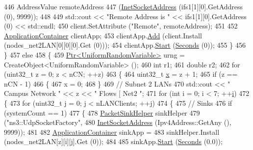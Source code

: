\begin{DoxyCode}
446           AddressValue remoteAddress
447             (\hyperlink{classns3_1_1InetSocketAddress}{InetSocketAddress} (ifs1[1][0].GetAddress (0), 9999));
448 
449           std::cout << \textcolor{stringliteral}{"Remote Address is "} << ifs1[1][0].GetAddress (0) << std::endl;
450           client.SetAttribute (\textcolor{stringliteral}{"Remote"}, remoteAddress);
451 
452           \hyperlink{classns3_1_1ApplicationContainer}{ApplicationContainer} clientApp;
453           clientApp.\hyperlink{classns3_1_1ApplicationContainer_ad09ab1a1ad5849d518d5f4c262e38152}{Add} (client.Install (nodes\_net2LAN[0][0][0].Get (0)));
454           clientApp.\hyperlink{classns3_1_1ApplicationContainer_a8eff87926507020bbe3e1390358a54a7}{Start} (\hyperlink{group__timecivil_ga33c34b816f8ff6628e33d5c8e9713b9e}{Seconds} (0));
455         \}
456     \}
457   \textcolor{keywordflow}{else}
458     \{
459       \hyperlink{classns3_1_1Ptr}{Ptr<UniformRandomVariable>} urng = CreateObject<UniformRandomVariable> ();
460       \textcolor{keywordtype}{int} r1;
461       \textcolor{keywordtype}{double} r2;
462       \textcolor{keywordflow}{for} (uint32\_t z = 0; z < nCN; ++z)
463         \{
464           uint32\_t \hyperlink{lte__link__budget__x2__handover__measures_8m_a9336ebf25087d91c818ee6e9ec29f8c1}{x} = z + 1;
465           \textcolor{keywordflow}{if} (z == nCN - 1)
466             \{
467               x = 0;
468             \}
469           \textcolor{comment}{// Subnet 2 LANs}
470           std::cout << \textcolor{stringliteral}{"  Campus Network "} << z << \textcolor{stringliteral}{" Flows [ Net2 "};
471           \textcolor{keywordflow}{for} (\textcolor{keywordtype}{int} i = 0; i < 7; ++\hyperlink{bernuolliDistribution_8m_a6f6ccfcf58b31cb6412107d9d5281426}{i})
472             \{
473               \textcolor{keywordflow}{for} (uint32\_t j = 0; j < nLANClients; ++j)
474                 \{
475                   \textcolor{comment}{// Sinks}
476                   \textcolor{keywordflow}{if} (systemCount == 1)
477                     \{
478                       \hyperlink{classns3_1_1PacketSinkHelper}{PacketSinkHelper} sinkHelper
479                         (\textcolor{stringliteral}{"ns3::UdpSocketFactory"},
480                         \hyperlink{classns3_1_1InetSocketAddress}{InetSocketAddress} (Ipv4Address::GetAny (), 9999));
481 
482                       \hyperlink{classns3_1_1ApplicationContainer}{ApplicationContainer} sinkApp =
483                         sinkHelper.Install (nodes\_net2LAN[z][i][j].Get (0));
484 
485                       sinkApp.\hyperlink{classns3_1_1ApplicationContainer_a8eff87926507020bbe3e1390358a54a7}{Start} (\hyperlink{group__timecivil_ga33c34b816f8ff6628e33d5c8e9713b9e}{Seconds} (0.0));

\end{DoxyCode}
